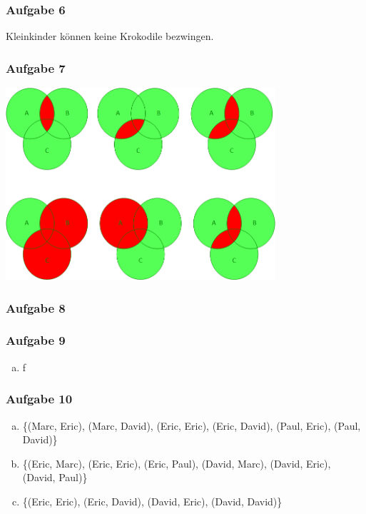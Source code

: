 \documentclass[12pt, a4paper, oneside]{article}
\begin{document}
\subsubsection{Aufgabe 6}
Kleinkinder können keine Krokodile bezwingen.

\subsubsection{Aufgabe 7} 
\begin{center}
  \includegraphics[width=0.75\textwidth]{ex3-7.png}
\end{center} 
 
\subsubsection{Aufgabe 8}

\subsubsection{Aufgabe 9}
\begin{enumerate}[(a)] 
  \item f
\end{enumerate}


\subsubsection{Aufgabe 10}
\begin{enumerate}[(a)]
  \item \{(Marc, Eric), (Marc, David), (Eric, Eric), (Eric, David), (Paul, Eric), (Paul, David)\}
  \item \{(Eric, Marc), (Eric, Eric), (Eric, Paul), (David, Marc), (David, Eric), (David, Paul)\}
  \item \{(Eric, Eric), (Eric, David), (David, Eric), (David, David)\}
\end{enumerate}

 
\end{document}
